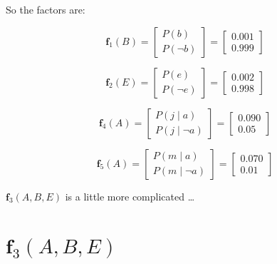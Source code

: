\documentclass[smaller]{article}
\begin{document}
So the factors are:

\begin{equation}
\bm{f}_1(B) =
\begin{bmatrix}
P(b) \\
P(\neg b)
\end{bmatrix}
=
\begin{bmatrix}
0.001 \\
0.999
\end{bmatrix}
\end{equation}


\begin{equation}
\bm{f}_2(E) =
\begin{bmatrix}
P(e) \\
P(\neg e)
\end{bmatrix}
=
\begin{bmatrix}
0.002 \\
0.998
\end{bmatrix}
\end{equation}


\vspace{.2in}



\begin{equation}
\bm{f}_4(A) =
\begin{bmatrix}
P(j \mid a) \\
P(j \mid \neg a)
\end{bmatrix}
=
\begin{bmatrix}
0.090 \\
0.05
\end{bmatrix}
\end{equation}



\begin{equation}
\bm{f}_5(A) =
\begin{bmatrix}
P(m \mid a) \\
P(m \mid \neg a)
\end{bmatrix}
=
\begin{bmatrix}
0.070 \\
0.01
\end{bmatrix}
\end{equation}

\vspace{.2in}


\(\bm{f}_3(A, B, E)\) is a little more complicated \ldots{}
\section{\(\bm{f}_3(A, B, E)\)}
\label{sec:orgcd295b1}
\end{document}
